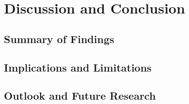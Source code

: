 \chapter{Discussion and Conclusion}
\label{ch:discussion}

\blindtext

\section{Summary of Findings}
\label{sec:summary-findings}

\blindtext

\section{Implications and Limitations}
\label{sec:implications-limitations}

\blindtext

\section{Outlook and Future Research}
\label{sec:outlook-future-research}

\blindtext